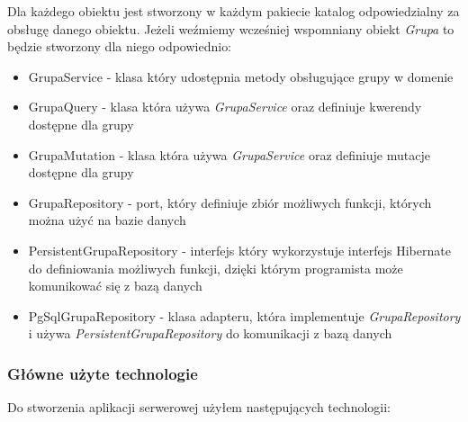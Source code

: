 Dla każdego obiektu jest stworzony w każdym pakiecie katalog odpowiedzialny za obsługę danego obiektu. Jeżeli weźmiemy wcześniej wspomniany obiekt \emph{Grupa} to będzie stworzony dla niego odpowiednio:
\begin{itemize}
  \item GrupaService - klasa który udostępnia metody obsługujące grupy w domenie
  \item GrupaQuery - klasa która używa \emph{GrupaService} oraz definiuje kwerendy dostępne dla grupy
  \item GrupaMutation - klasa która używa \emph{GrupaService} oraz definiuje mutacje dostępne dla grupy
  \item GrupaRepository - port, który definiuje zbiór możliwych funkcji, których można użyć na bazie danych
  \item PersistentGrupaRepository - interfejs który wykorzystuje interfejs Hibernate do definiowania możliwych funkcji, dzięki którym programista może komunikować się z bazą danych
  \item PgSqlGrupaRepository - klasa adapteru, która implementuje \emph{GrupaRepository} i używa \emph{PersistentGrupaRepository} do komunikacji z bazą danych
\end{itemize}

\subsubsection{Główne użyte technologie}
Do stworzenia aplikacji serwerowej użyłem następujących technologii:

